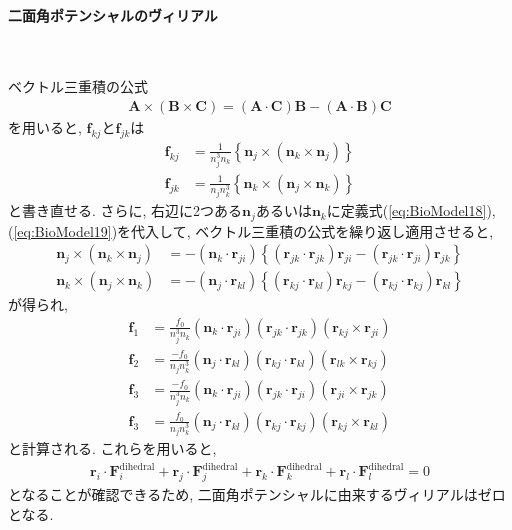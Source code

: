 \paragraph{二面角ポテンシャルのヴィリアル} \

ベクトル三重積の公式
\begin{align}
   \bm{A} \times (\bm{B} \times \bm{C})
 =
   (\bm{A} \cdot \bm{C}) \bm{B}
  -(\bm{A} \cdot \bm{B}) \bm{C}
\end{align}
を用いると, $\bm{f}_{kj}$と$\bm{f}_{jk}$は
\begin{align}
    \bm{f}_{kj}
 &=
    \frac{1}{n_{j}^{3} n_{k}}
    \left\{
            \bm{n}_{j} \times (\bm{n}_{k} \times \bm{n}_{j})
     \right\}
 \\
    \bm{f}_{jk}
 &=
    \frac{1}{n_{j} n_{k}^{3}}
    \left\{
            \bm{n}_{k} \times (\bm{n}_{j} \times \bm{n}_{k})
    \right\}
\end{align}
と書き直せる. さらに, 右辺に2つある$\bm{n}_{j}$あるいは$\bm{n}_k$に定義式(\ref{eq:BioModel18}), (\ref{eq:BioModel19})を代入して, 
ベクトル三重積の公式を繰り返し適用させると, 
\begin{align}
    \bm{n}_{j} \times (\bm{n}_{k} \times \bm{n}_{j})
 &=
   -(\bm{n}_{k} \cdot \bm{r}_{ji})
    \left\{
            (\bm{r}_{jk} \cdot \bm{r}_{jk})\bm{r}_{ji}
           -(\bm{r}_{jk} \cdot \bm{r}_{ji})\bm{r}_{jk}
    \right\}
 \\
    \bm{n}_{k} \times (\bm{n}_{j} \times \bm{n}_{k})
 &=
   -(\bm{n}_{j} \cdot \bm{r}_{kl})
    \left\{
            (\bm{r}_{kj} \cdot \bm{r}_{kl})\bm{r}_{kj}
           -(\bm{r}_{kj} \cdot \bm{r}_{kj})\bm{r}_{kl}
    \right\}
\end{align}
が得られ, 
\begin{align}
    \bm{f}_{1}
 &= 
    \frac{f_{0}}{n_{j}^{3}n_{k}}
    (\bm{n}_{k} \cdot \bm{r}_{ji})
    (\bm{r}_{jk} \cdot \bm{r}_{jk})
    (\bm{r}_{kj} \times \bm{r}_{ji})
 \\
    \bm{f}_{2}
 &= 
    \frac{-f_{0}}{n_{j}n_{k}^{3}}
    (\bm{n}_{j} \cdot \bm{r}_{kl})
    (\bm{r}_{kj} \cdot \bm{r}_{kl})
    (\bm{r}_{lk} \times \bm{r}_{kj})
 \\
    \bm{f}_{3}
 &= 
    \frac{-f_{0}}{n_{j}^{3}n_{k}}
    (\bm{n}_{k} \cdot \bm{r}_{ji})
    (\bm{r}_{jk} \cdot \bm{r}_{ji})
    (\bm{r}_{ji} \times \bm{r}_{jk})
 \\
    \bm{f}_{3}
 &= 
    \frac{f_{0}}{n_{j}n_{k}^{3}}
    (\bm{n}_{j} \cdot \bm{r}_{kl})
    (\bm{r}_{kj} \cdot \bm{r}_{kj})
    (\bm{r}_{kj} \times \bm{r}_{kl})
\end{align}
と計算される. これらを用いると,
\begin{align}
   \bm{r}_{i} \cdot \bm{F}_{i}^{\mathrm{dihedral}}
 + \bm{r}_{j} \cdot \bm{F}_{j}^{\mathrm{dihedral}}
 + \bm{r}_{k} \cdot \bm{F}_{k}^{\mathrm{dihedral}}
 + \bm{r}_{l} \cdot \bm{F}_{l}^{\mathrm{dihedral}}
 = 0
\end{align}
となることが確認できるため, 二面角ポテンシャルに由来するヴィリアルはゼロとなる. 

